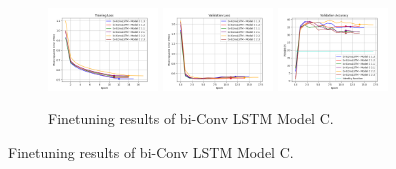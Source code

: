 \documentclass{beamer}
\begin{document}
\begin{frame}
\begin{figure}[htbp]
        \begin{subfigure}[b]{\textwidth}
            \centering
            \includegraphics[width=0.32\textwidth]{../report/entities/finetuned/unipose2/train_losses.png}
            \includegraphics[width=0.32\textwidth]{../report/entities/finetuned/unipose2/val_losses.png}
            \includegraphics[width=0.32\textwidth]{../report/entities/finetuned/unipose2/val_accs.png}
            \caption{Finetuning results of bi-Conv LSTM Model C.}
        \end{subfigure}
        \hfill
    \end{figure}
\end{frame}
\end{document}
